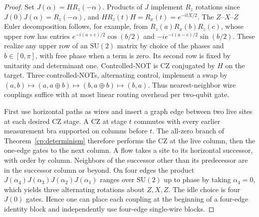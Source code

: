 \documentclass[aps,pra,onecolumn,superscriptaddress,nofootinbib,10pt]{revtex4-2}
\theoremstyle{definition}
\theoremstyle{remark}
\newcommand{\SU}{\mathrm{SU}}
\begin{document}
\begin{proof}
Set $J(\alpha)=H R_z(-\alpha)$. Products of $J$ implement $R_z$ rotations since $J(0)J(\alpha)=R_z(-\alpha)$, and $H R_z(t)H=R_x(t)=e^{-itX/2}$. The $Z$--$X$--$Z$ Euler decomposition follows, for example, from
$R_z(a)R_x(b)R_z(c)$, whose upper row has entries $e^{-i(a+c)/2}\cos(b/2)$ and $-ie^{-i(a-c)/2}\sin(b/2)$. These realize any upper row of an $\SU(2)$ matrix by choice of the phases and $b\in[0,\pi]$, with free phase when a term is zero. Its second row is fixed by unitarity and determinant one. Controlled-NOT is $\mathrm{CZ}$ conjugated by $H$ on the target. Three controlled-NOTs, alternating control, implement a swap by $(a,b)\mapsto(a,a\oplus b)\mapsto(b,a\oplus b)\mapsto(b,a)$. Thus nearest-neighbor wire couplings suffice with at most linear routing overhead per two-qubit gate.

First use horizontal paths as wires and insert a graph edge between two live sites at each desired $\mathrm{CZ}$ stage. A $\mathrm{CZ}$ at stage $t$ commutes with every earlier measurement bra supported on columns before $t$. The all-zero branch of Theorem~\ref{cp:determinism} therefore performs the $\mathrm{CZ}$ at the live column, then the one-edge gates to the next column. A flow takes a site to its horizontal successor, with order by column. Neighbors of the successor other than its predecessor are in the successor column or beyond. On four edges the product
$J(\alpha_4)J(\alpha_3)J(\alpha_2)J(\alpha_1)$ ranges over $\SU(2)$ up to phase by taking $\alpha_4=0$, which yields three alternating rotations about $Z,X,Z$. The idle choice is four $J(0)$ gates. Hence one can place each coupling at the beginning of a four-edge identity block and independently use four-edge single-wire blocks.


\end{proof}
\end{document}
